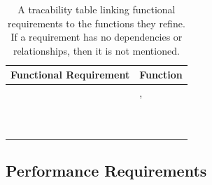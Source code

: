 \documentclass{article}
\begin{document}
\begin{table}[!h]
\begin{center}
\caption {A tracability table linking functional requirements to the functions they refine. If a requirement has no dependencies or relationships, then it is not mentioned. }
\label{TRACE_FR_Func}
\begin{tabular}{ | m{7cm} | m{7cm} | }
\hline
Functional Requirement & Function  \\
\hline
\nameref{GEN_001} & \nameref{Autonomous Explore State},\nameref{Compulsive Move State}  \\
\hline
\nameref{STA_000} & \nameref{Idle State}  \\
\hline
\nameref{STA_001} & \nameref{Hover State}  \\
\hline
\nameref{STA_003} & \nameref{Autonomous Explore State}  \\
\hline
\nameref{STA_004} & \nameref{Configure State}  \\
\hline
\nameref{STA_005} & \nameref{Off State}  \\
\hline
\nameref{STA_006} & \nameref{Land State}  \\
\hline
\nameref{STA_008} & \nameref{No Parking Lot Detected Error State}  \\
\hline
\nameref{STA_009} & \nameref{Malfunction State}  \\
\hline
\nameref{STA_010} & \nameref{Communication Lost State}  \\
\hline
\nameref{STA_011} & \nameref{Compulsive Move State}  \\
\hline
\end{tabular}
\end{center}
\end{table}

\clearpage
\newpage

\subsection{Performance Requirements}
\end{document}
